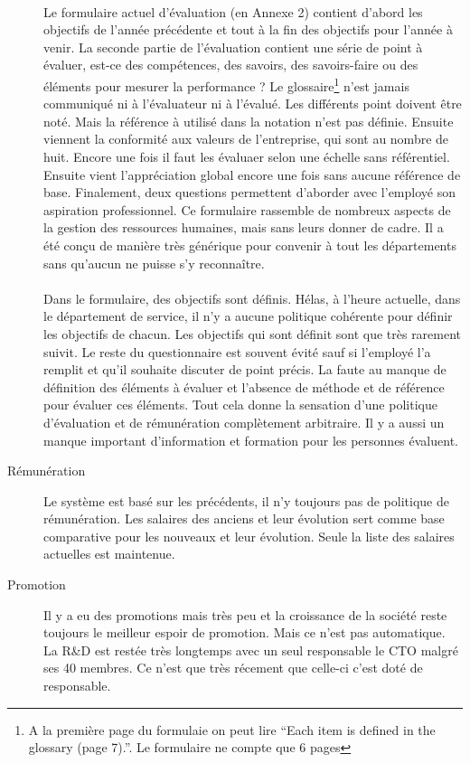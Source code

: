 \begin{description}
\paragraph{}Le formulaire actuel d'évaluation (en Annexe 2) contient d'abord les objectifs de l'année précédente et tout à la fin des objectifs pour l'année à venir. La seconde partie de l'évaluation contient une série de point à évaluer, est-ce des compétences, des savoirs, des savoirs-faire ou des éléments pour mesurer la performance ? Le glossaire\footnote{A la première page du formulaie on peut lire \enquote{Each item is defined in the glossary (page 7).}. Le formulaire ne compte que 6 pages} n'est jamais communiqué ni à l'évaluateur ni à l'évalué. Les différents point doivent être noté. Mais la référence à utilisé dans la notation n'est pas définie. Ensuite viennent la conformité aux valeurs de l'entreprise, qui sont au nombre de huit. Encore une fois il faut les évaluaer selon une échelle sans référentiel. Ensuite vient l'appréciation global encore une fois sans aucune référence de base. Finalement, deux questions permettent d'aborder avec l'employé son aspiration professionnel. Ce formulaire rassemble de nombreux aspects de la gestion des ressources humaines, mais sans leurs donner de cadre. Il a été conçu de manière très générique pour convenir à tout les départements sans qu'aucun ne puisse s'y reconnaître.

\paragraph{}Dans le formulaire, des objectifs sont définis. Hélas, à l'heure actuelle, dans le département de service, il n'y a aucune politique cohérente pour définir les objectifs de chacun. Les objectifs qui sont définit sont que très rarement suivit. Le reste du questionnaire est souvent évité sauf si l'employé l'a remplit et qu'il souhaite discuter de point précis. La faute au manque de définition des éléments à évaluer et l'absence de méthode et de référence pour évaluer ces éléments. Tout cela donne la sensation d'une politique d'évaluation et de rémunération complètement arbitraire. Il y a aussi un manque important d'information et formation pour les personnes évaluent.
  \item[Rémunération] Le système est basé sur les précédents, il n'y toujours pas de politique de rémunération. Les salaires des anciens et leur évolution sert comme base comparative pour les nouveaux et leur évolution. Seule la liste des salaires actuelles est maintenue.
  
  \item[Promotion] Il y a eu des promotions mais très peu et la croissance de la société reste toujours le meilleur espoir de promotion. Mais ce n'est pas automatique. La R\&D est restée très longtemps avec un seul responsable le CTO malgré ses 40 membres. Ce n'est que très récement que celle-ci c'est doté de responsable.  
\end{description}


